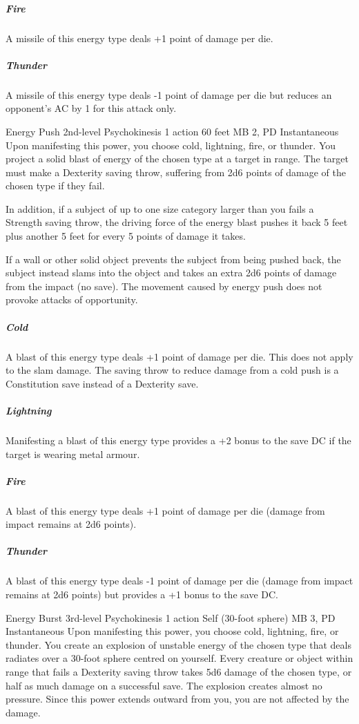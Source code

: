   \subparagraph{Fire}
  A missile of this energy type deals +1 point of damage per die.
  
  \subparagraph{Thunder}
  A missile of this energy type deals -1 point of damage per die
  but reduces an opponent's AC by 1 for this attack only.

\DndPowerHeader%
  {Energy Push}
  {2nd-level Psychokinesis}
  {1 action}
  {60 feet}
  {MB 2, PD \lvltwo}
  {Instantaneous}
  Upon manifesting this power, you choose cold, lightning, fire, or thunder.
  You project a solid blast of energy of the chosen type at a target in range.
  The target must make a Dexterity saving throw,
  suffering from 2d6 points of damage of the chosen type if they fail.
  
  In addition, if a subject of up to one size category larger than you
  fails a Strength saving throw,
  the driving force of the energy blast pushes it back 5 feet
  plus another 5 feet for every 5 points of damage it takes.
  
  If a wall or other solid object prevents the subject from being pushed back,
  the subject instead slams into the object and takes an extra
  2d6 points of damage from the impact (no save).
  The movement caused by energy push does not provoke attacks of opportunity.
  \subparagraph{Cold}
    A blast of this energy type deals +1 point of damage per die.
    This does not apply to the slam damage.
    The saving throw to reduce damage from a cold push
    is a Constitution save instead of a Dexterity save.
  \subparagraph{Lightning}
    Manifesting a blast of this energy type provides a +2 bonus
    to the save DC if the target is wearing metal armour.
  \subparagraph{Fire}
    A blast of this energy type deals +1 point of damage per die
    (damage from impact remains at 2d6 points).
  \subparagraph{Thunder}
    A blast of this energy type deals -1 point of damage per die
    (damage from impact remains at 2d6 points)
    but provides a +1 bonus to the save DC.

\DndPowerHeader%
  {Energy Burst}
  {3rd-level Psychokinesis}
  {1 action}
  {Self (30-foot sphere)}
  {MB 3, PD \lvlthree}
  {Instantaneous}
Upon manifesting this power, you choose cold, lightning,
fire, or thunder.
You create an explosion of unstable energy of the chosen type
that deals radiates over a 30-foot sphere
centred on yourself.
Every creature or object within range that fails a Dexterity saving throw
takes 5d6 damage of the chosen type, or
half as much damage on a successful save.
The explosion creates almost no pressure.
Since this power extends outward from you,
you are not affected by the damage.

